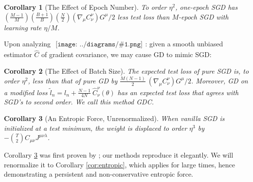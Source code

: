 \documentclass{article}
\theoremstyle{plain}
\newtheorem{cor}{Corollary}
\theoremstyle{definition}
\newcommand{\wrap}[1]{\left(#1\right)}
\newcommand{\sdia}[1]{\begin{gathered}\texttt{[image: ../diagrams/\#1.png]}\end{gathered}}
\begin{document}
        \begin{cor}[The Effect of Epoch Number] \label{cor:epochs}
            To order $\eta^2$, one-epoch SGD has 
            $
                 \wrap{\frac{M-1}{M}}\wrap{\frac{B+1}{B}}\wrap{\frac{N}{2}}
                 \wrap{\nabla_\mu C^{\nu}_{\nu}} G^\mu / 2
            $
            less test loss than $M$-epoch SGD with learning rate $\eta/M$.
        \end{cor}
    
        Upon analyzing $\sdia{c(01-2)(01-12)}$: given a smooth unbiased
        estimator $\hat{C}$ of gradient covariance, we may cause GD to mimic
        SGD:
        \begin{cor}[The Effect of Batch Size] \label{cor:batch}
            The expected test loss of pure SGD is, to order $\eta^2$,
            less than that of pure GD by
            $
                  \frac{M(N-1)}{2} ~
                  \wrap{\nabla_\mu C^{\nu}_{\nu}} G^\mu / 2
            $.
            Moreover, GD on a modified loss 
            $
                \tilde l_n = l_n +
                    \frac{N-1}{4N} ~
                    \hat{C}_\nu^\nu(\theta)
            $
            has an expected test loss that agrees with SGD's to second order.
            We call this method GDC.
        \end{cor}
    
        \begin{cor}[An Entropic Force, Unrenormalized] \label{cor:noncons}
            When vanilla SGD is initialized at a test minimum, the weight is
            displaced to order $\eta^3$ by 
            $
                -{T \choose 2} C_{\mu \nu} J^{\mu \nu \lambda}
            $.
        \end{cor}
        Corollary \ref{cor:noncons} was first proven by \citet{ya19b}; our
        methods reproduce it elegantly.  We will renormalize it to Corollary
        \ref{cor:entropic}, which applies for large times, hence demonstrating
        a persistent and non-conservative entropic force.
    
\end{document}

